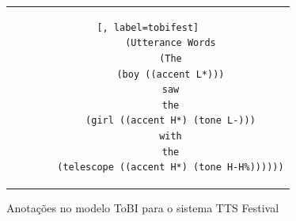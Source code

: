 \begin{figure}[thp] %
    \centering          %
    \begin{tabular}{c}  %
        \begin{lstlisting}[, label=tobifest]
        (Utterance Words
        (The
        (boy ((accent L*)))
        saw
        the
        (girl ((accent H*) (tone L-)))
        with
        the
        (telescope ((accent H*) (tone H-H%))))))
        \end{lstlisting}
    \end{tabular}
    \caption{Anotações no modelo ToBI para o sistema TTS Festival}
\end{figure}
